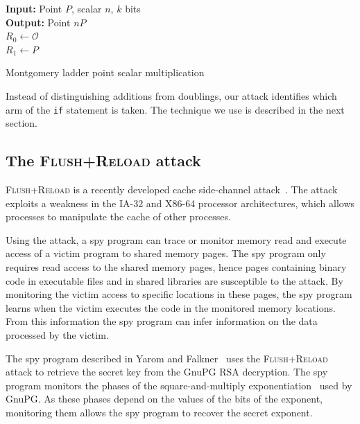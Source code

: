 \documentclass[twocolumn]{svjour3}
\newcommand{\fl}{\textsc{Flu\-sh+\allowbreak Re\-load}\xspace}
\begin{document}
\vspace{-0.5cm}
\begin{algorithm}[htb]\label{mont}
 \SetAlgoLined
{\bf Input:} Point $P$, scalar $n$, $k$ bits\\
{\bf Output:} Point $nP$\\
$R_0\gets \mathcal{O}$\\
$R_1\gets P$\\
 \caption{Montgomery ladder point scalar multiplication}
\end{algorithm}\vspace{-0.5cm}


Instead of distinguishing additions from doublings, our attack identifies which arm of the \texttt{if} statement is taken.
The technique we use is described in the next section.



\subsection{The \fl attack}
\fl is a recently developed cache side-channel attack~\cite{yarom13flush}.
The attack exploits a weakness in the IA-32 and X86-64 processor architectures, which allows
processes to manipulate the cache of other processes.

Using the attack, a spy program can trace or monitor memory read and execute access of a victim program to shared memory pages.
The spy program only requires read access to the shared memory pages, hence pages containing binary code in executable files and
in shared libraries are susceptible to the attack.
By monitoring the victim access to specific locations in these pages, the spy program learns when the victim
executes the code in the monitored memory locations.
From this information the spy program can infer information on the data processed by the victim.

The spy program described in Yarom and Falkner~\cite{yarom13flush} uses the \fl attack to retrieve
the secret key from the GnuPG RSA decryption.
The spy program monitors the phases of the square-and-multiply exponentiation~\cite{gordon98survey} used by GnuPG.  
As these phases depend on the values of the bits of the exponent, monitoring them
allows the spy program to recover the secret exponent.
\end{document}
